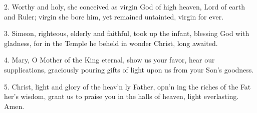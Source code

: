 
2. Worthy and holy, she conceived as virgin
God of high heaven, Lord of earth and Ruler;
virgin she bore him, yet remained untainted,
virgin for ever.

3. Simeon, righteous, elderly and faithful,
took up the infant, blessing God with gladness,
for in the Temple he beheld in wonder
Christ, long awaited.

4. Mary, O Mother of the King eternal,
show us your favor, hear our supplications,
graciously pouring gifts of light upon us
from your Son’s goodness.

5. Christ, light and glory of the heav’n ly Father,
opn’n ing the riches of the Fat her’s wisdom,
grant us to praise you in the halls of heaven,
light everlasting. Amen.